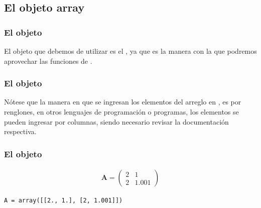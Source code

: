 \subsection*{El objeto array}
\begin{frame}
\frametitle{El objeto }
El objeto que debemos de utilizar es el , ya que es la manera con la que podremos aprovechar las funciones de \python{}.
\end{frame}
\begin{frame}
\frametitle{El objeto }
Nótese que la manera en que se ingresan los elementos del arreglo en \python{}, es por renglones, en otros lenguajes de programación o programas, los elementos se pueden ingresar por columnas, siendo necesario revisar la documentación respectiva.
\end{frame}
\begin{frame}[fragile]
\frametitle{El objeto }    
\begin{align*}
\mathbf{A} = \begin{pmatrix}
2 & 1 \\
2 & 1.001
\end{pmatrix}
\end{align*}
\vspace{1cm}
\begin{verbatim}
A = array([[2., 1.], [2, 1.001]])
\end{verbatim}
\end{frame}

